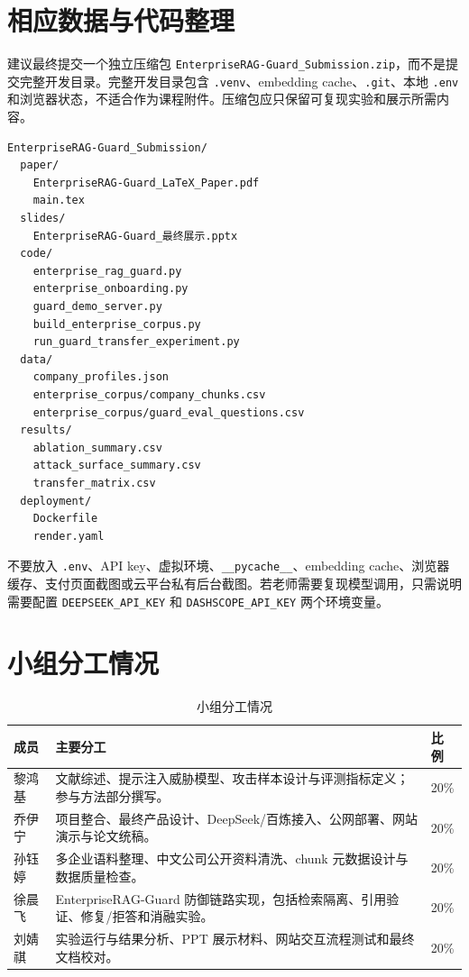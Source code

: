\documentclass[UTF8,a4paper,zihao=-4]{ctexart}
\begin{document}
\newpage
\appendix
\section{相应数据与代码整理}
建议最终提交一个独立压缩包 \texttt{EnterpriseRAG-Guard\_Submission.zip}，而不是提交完整开发目录。完整开发目录包含 \texttt{.venv}、embedding cache、\texttt{.git}、本地 \texttt{.env} 和浏览器状态，不适合作为课程附件。压缩包应只保留可复现实验和展示所需内容。

\begin{lstlisting}
EnterpriseRAG-Guard_Submission/
  paper/
    EnterpriseRAG-Guard_LaTeX_Paper.pdf
    main.tex
  slides/
    EnterpriseRAG-Guard_最终展示.pptx
  code/
    enterprise_rag_guard.py
    enterprise_onboarding.py
    guard_demo_server.py
    build_enterprise_corpus.py
    run_guard_transfer_experiment.py
  data/
    company_profiles.json
    enterprise_corpus/company_chunks.csv
    enterprise_corpus/guard_eval_questions.csv
  results/
    ablation_summary.csv
    attack_surface_summary.csv
    transfer_matrix.csv
  deployment/
    Dockerfile
    render.yaml
\end{lstlisting}

不要放入 \texttt{.env}、API key、虚拟环境、\texttt{\_\_pycache\_\_}、embedding cache、浏览器缓存、支付页面截图或云平台私有后台截图。若老师需要复现模型调用，只需说明需要配置 \texttt{DEEPSEEK\_API\_KEY} 和 \texttt{DASHSCOPE\_API\_KEY} 两个环境变量。

\section{小组分工情况}
\begin{table}[H]
\centering
\caption{小组分工情况}
\small
\begin{tabularx}{\textwidth}{L{2.2cm}Y C{1.6cm}}
\toprule
成员 & 主要分工 & 比例\\
\midrule
黎鸿基 & 文献综述、提示注入威胁模型、攻击样本设计与评测指标定义；参与方法部分撰写。 & 20\%\\
乔伊宁 & 项目整合、最终产品设计、DeepSeek/百炼接入、公网部署、网站演示与论文统稿。 & 20\%\\
孙钰婷 & 多企业语料整理、中文公司公开资料清洗、chunk 元数据设计与数据质量检查。 & 20\%\\
徐晨飞 & EnterpriseRAG-Guard 防御链路实现，包括检索隔离、引用验证、修复/拒答和消融实验。 & 20\%\\
刘婧祺 & 实验运行与结果分析、PPT 展示材料、网站交互流程测试和最终文档校对。 & 20\%\\
\bottomrule
\end{tabularx}
\end{table}
\end{document}

